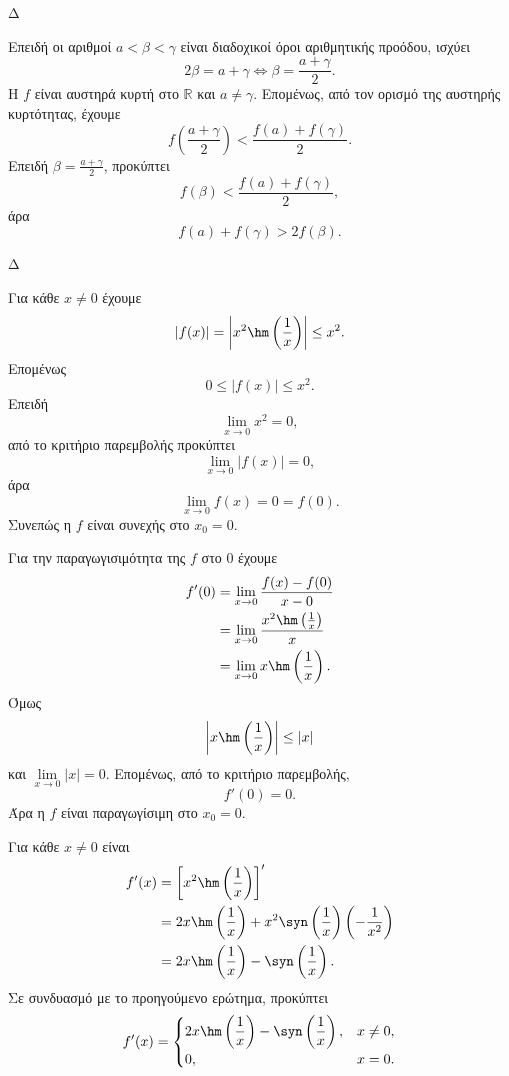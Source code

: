 \begin{thema}{Δ}
\begin{erwthma}
\item Επειδή οι αριθμοί $a<\beta<\gamma$ είναι διαδοχικοί όροι αριθμητικής προόδου, ισχύει
\[
2\beta=a+\gamma
\Leftrightarrow
\beta=\frac{a+\gamma}{2}.
\]
Η $f$ είναι αυστηρά κυρτή στο $\mathbb{R}$ και $a\neq\gamma$. Επομένως, από τον ορισμό της αυστηρής κυρτότητας, έχουμε
\[
f\left(\frac{a+\gamma}{2}\right)
<\frac{f(a)+f(\gamma)}{2}.
\]
Επειδή $\beta=\frac{a+\gamma}{2}$, προκύπτει
\[
f(\beta)<\frac{f(a)+f(\gamma)}{2},
\]
άρα
\[
{f(a)+f(\gamma)>2f(\beta)}.
\]
\end{erwthma}
\end{thema}

\begin{thema}{Δ}
\begin{erwthma}
\item Για κάθε $x\neq0$ έχουμε
\[
\left|f(x)\right|
=\left|x^2\hm\left(\frac{1}{x}\right)\right|
\leq x^2.
\]
Επομένως
\[
0\leq|f(x)|\leq x^2.
\]
Επειδή
\[
\lim_{x\to0}x^2=0,
\]
από το κριτήριο παρεμβολής προκύπτει
\[
\lim_{x\to0}|f(x)|=0,
\]
άρα
\[
\lim_{x\to0}f(x)=0=f(0).
\]
Συνεπώς η $f$ είναι συνεχής στο $x_0=0$.

Για την παραγωγισιμότητα της $f$ στο $0$ έχουμε
\begin{align*}
f'(0)
&=\lim_{x\to0}\frac{f(x)-f(0)}{x-0}\\
&=\lim_{x\to0}\frac{x^2\hm\left(\frac{1}{x}\right)}{x}\\
&=\lim_{x\to0}x\hm\left(\frac{1}{x}\right).
\end{align*}
Όμως
\[
\left|x\hm\left(\frac{1}{x}\right)\right|\leq|x|
\]
και $\lim\limits_{x\to0}|x|=0$. Επομένως, από το κριτήριο παρεμβολής,
\[
{f'(0)=0}.
\]
Άρα η $f$ είναι παραγωγίσιμη στο $x_0=0$.

\item Για κάθε $x\neq0$ είναι
\begin{align*}
f'(x)
&=\left[x^2\hm\left(\frac{1}{x}\right)\right]'\\
&=2x\hm\left(\frac{1}{x}\right)
+x^2\syn\left(\frac{1}{x}\right)
\left(-\frac{1}{x^2}\right)\\
&=2x\hm\left(\frac{1}{x}\right)
-\syn\left(\frac{1}{x}\right).
\end{align*}
Σε συνδυασμό με το προηγούμενο ερώτημα, προκύπτει
\[
{
f'(x)=
\begin{cases}
2x\hm\left(\dfrac{1}{x}\right)-\syn\left(\dfrac{1}{x}\right),
&x\neq0,\\[2mm]
0,&x=0.
\end{cases}}
\]


\end{erwthma}
\end{thema}

